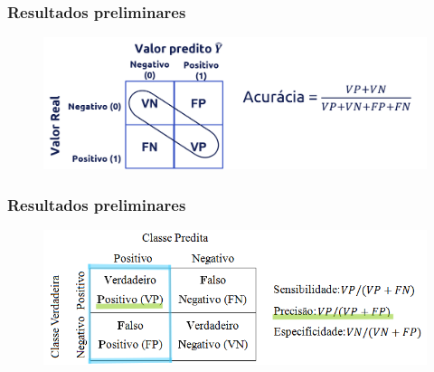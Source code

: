 \documentclass[aspectratio=169]{beamer}
\begin{document}







\begin{frame}
    \frametitle{Resultados preliminares}


    \centering

    \begin{figure}
        \centering
        \includegraphics[scale = 0.5]{img/curacia.png}
        \label{fig:enter-label}
    \end{figure}


\end{frame}












\begin{frame}
    \frametitle{Resultados preliminares}


    \centering

    \begin{figure}
        \centering
        \includegraphics[scale = 0.7]{img/precisonmetric.png}
        \label{fig:enter-label}
    \end{figure}


\end{frame}
\end{document}
